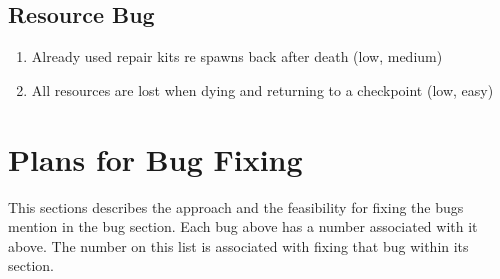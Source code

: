 \documentclass{article}
\begin{document}
\subsection*{Resource Bug}
\begin{enumerate}
	\item Already used repair kits re spawns back after death (low, medium)
	\item All resources are lost when dying and returning to a checkpoint  (low, easy)
\end{enumerate}





\section*{Plans for Bug Fixing}
This sections describes the approach and the feasibility for fixing the bugs mention in the bug section.
Each bug above has a number associated with it above. The number on this list is associated with fixing that bug within its section. 
\end{document}
